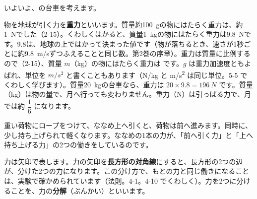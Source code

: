 \leavevmode\label{bk:4-6:bunkai}いよいよ、\bkhatenaref の台車を考えます。

物を地球が引く力を\textbf{重力}といいます。質量約\qty{100}{g}の物にはたらく重力は、約\qty{1}{N}でした（2-15）。くわしくはかると、質量\qty{1}{kg}の物にはたらく重力は\qty{9.8}{N}です。9.8は、地球の上ではかって決まった値です（物が落ちるとき、速さが1秒ごとに約\qty{9.8}{m/s}ずつふえることと同じ数。第2巻の序章）。重力は質量に比例するので（2-15）、質量 $m$（kg）の物にはたらく重力は
です。$g$ は重力加速度ともよばれ、単位を $\unit{m/s^2}$ と書くこともあります（\unit{N/kg} と \unit{m/s^2} は同じ単位。5-5 でくわしく学びます）。質量\qty{20}{kg}の台車なら、重力は $20\times9.8=\qty{196}{N}$ です。質量（kg）は物の量で、月へ行っても変わりません。重力（N）は引っぱる力で、月では約 $\dfrac{1}{6}$ になります。

\noindent\begin{minipage}[c]{0.58\linewidth}
重い荷物にロープをつけて、ななめ上へ引くと、荷物は前へ進みます。同時に、少し持ち上げられて軽くなります。ななめの1本の力が、「前へ引く力」と「上へ持ち上げる力」の2つの働きをしているのです。\par\vspace{2pt}
力は矢印で表します。力の矢印を\textbf{長方形の対角線}にすると、長方形の2つの辺が、分けた2つの力になります。この分け方で、もとの力と同じ働きになることは、実験で確かめられています（法則。4-1。4-10 でくわしく）。力を2つに分けることを、力の\textbf{分解}（ぶんかい）といいます。
\end{minipage}\hfill
\begin{minipage}[c]{0.38\linewidth}\centering
{}
\end{minipage}

